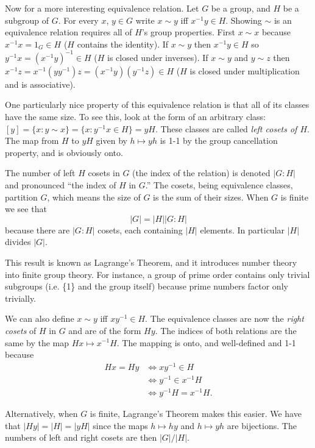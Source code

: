 \documentclass[letterpaper]{article}
\begin{document}
Now for a more interesting equivalence relation. Let $G$ be a group, and $H$ be a subgroup of $G$. For every $x$, $y \in G$ write $x \sim y$ iff $x^{-1}y \in H$. Showing $\sim$ is an equivalence relation requires all of $H$'s group properties. First $x \sim x$ because $x^{-1}x = 1_G \in H$ ($H$ contains the identity). If $x \sim y$ then $x^{-1}y \in H$ so $y^{-1}x = (x^{-1}y)^{-1} \in H$ ($H$ is closed under inverses). If $x \sim y$ and $y \sim z$ then $x^{-1}z = x^{-1}(yy^{-1})z = (x^{-1}y)(y^{-1}z) \in H$ ($H$ is closed under multiplication and is associative).

One particularly nice property of this equivalence relation is that all of its classes have the same size. To see this, look at the form of an arbitrary class: $\left[y\right] = \{x: y \sim x\} = \{x: y^{-1}x \in H\} = yH$. These classes are called \emph{left cosets of $H$}. The map from $H$ to $yH$ given by $h \mapsto yh$ is 1-1 by the group cancellation property, and is obviously onto.

The number of left $H$ cosets in $G$ (the index of the relation) is denoted $|G : H|$ and pronounced ``the index of $H$ in $G$.'' The cosets, being equivalence classes, partition $G$, which means the size of $G$ is the sum of their sizes.  When $G$ is finite we see that \[|G| = |H||G : H|\] because there are $|G : H|$ cosets, each containing $|H|$ elements. In particular $|H|$ divides $|G|$.

This result is known as Lagrange's Theorem, and it introduces number theory into finite group theory. For instance, a group of prime order contains only trivial subgroups (i.e. \{1\} and the group itself) because prime numbers factor only trivially.

We can also define $x \sim y$ iff $xy^{-1} \in H$. The equivalence classes are now the \emph{right cosets} of $H$ in $G$ and are of the form $Hy$.  The indices of both relations are the same by the map $Hx \mapsto x^{-1}H$. The mapping is onto, and well-defined and 1-1 because
\begin{align*}
Hx = Hy &\Longleftrightarrow xy^{-1} \in H\\
        &\Longleftrightarrow y^{-1} \in x^{-1}H\\
		&\Longleftrightarrow y^{-1}H = x^{-1}H.
\end{align*}

Alternatively, when $G$ is finite, Lagrange's Theorem makes this easier. We have that $|Hy| = |H| = |yH|$ since the maps $h \mapsto hy$ and $h \mapsto yh$ are bijections. The numbers of left  and right cosets are then $|G|/|H|$.
\end{document}

